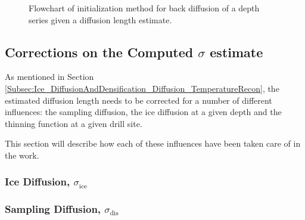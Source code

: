 \documentclass[../../CompleteThesis2/Complete_2ndDraft]{subfiles}
\begin{document}
\begin{figure}
	\caption[Flowchart]{Flowchart of initialization method for back diffusion of a depth series given a diffusion length estimate.}
	\label{Fig:FlowchartBackDiffusion}
\end{figure}


\subsection[Corrections on $\sigma$][Corrections on $\sigma$]{Corrections on the Computed $\sigma$ estimate}
\label{Subsec:Method_SigmaMethod_SigmaCorrections}
As mentioned in Section \ref{Subsec:Ice_DiffusionAndDensification_Diffusion_TemperatureRecon}, the estimated diffusion length needs to be corrected for a number of different influences: the sampling diffusion, the ice diffusion at a given depth and the thinning function at a given drill site.

This section will describe how each of these influences have been taken care of in the work.

\subsubsection{Ice Diffusion, $\sigma_{\text{ice}}$}
\label{Subsubsec:Method_SigmaMethod_SigmaCorrections_IceDiffusion}

\subsubsection{Sampling Diffusion, $\sigma_{\text{dis}}$}
\label{Subsubsec:Method_SigmaMethod_SigmaCorrections_SamplingDiffusion}
\end{document}
